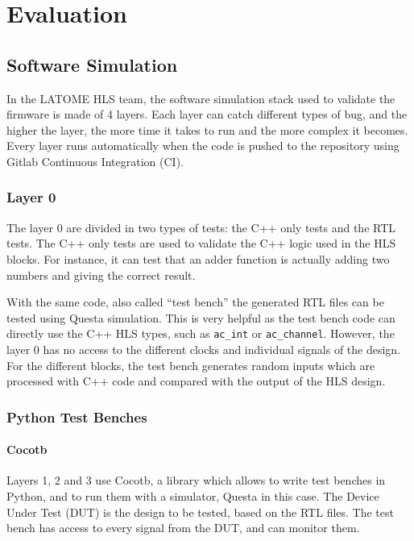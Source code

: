 \chapter{Evaluation}\label{sec:evaluation}

\section{Software Simulation}

In the LATOME HLS team, the software simulation stack used to validate the firmware is made of 4 layers. Each layer can catch different types of bug, and the higher the layer, the more time it takes to run and the more complex it becomes. Every layer runs automatically when the code is pushed to the repository using Gitlab Continuous Integration (CI).

\subsection{Layer 0}

The layer 0 are divided in two types of tests: the C++ only tests and the RTL tests. The C++ only tests are used to validate the C++ logic used in the HLS blocks. For instance, it can test that an adder function is actually adding two numbers and giving the correct result.

With the same code, also called ``test bench'' the generated RTL files can be tested using Questa simulation. This is very helpful as the test bench code can directly use the C++ HLS types, such as \verb|ac_int| or \verb|ac_channel|. However, the layer 0 has no access to the different clocks and individual signals of the design. For the different blocks, the test bench generates random inputs which are processed with C++ code and compared with the output of the HLS design.

\subsection{Python Test Benches}

\subsubsection{Cocotb}

Layers 1, 2 and 3 use Cocotb, a library which allows to write test benches in Python, and to run them with a simulator, Questa in this case. The Device Under Test (DUT) is the design to be tested, based on the RTL files. The test bench has access to every signal from the DUT, and can monitor them.

